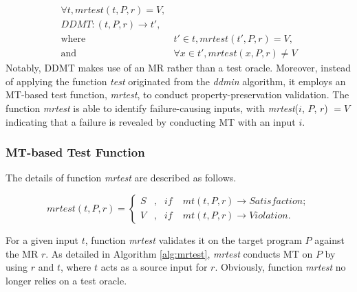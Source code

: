 \begin{equation}
\begin{aligned}
\forall t, mrtest(t,P,r) = V,    & \\
 DDMT: (t, P, r) \rightarrow t', &\\
\text{where } & t' \in t, mrtest(t',P,r)=V, \\
\text{and } & \forall x \in t', mrtest(x,P,r) \neq V
\end{aligned}
\label{eq:ddmt}
\end{equation}
Notably, DDMT makes use of an MR rather than a test oracle.
Moreover, instead of applying the function \emph{test} originated from the \emph{ddmin} algorithm, it employs an MT-based test function, \emph{mrtest}, to conduct property-preservation validation.
The function \emph{mrtest} is able to identify failure-causing inputs, with \emph{mrtest}($i$, $P$, $r$) $= V$ indicating that a failure is revealed by conducting MT with an input $i$.



\subsubsection{MT-based Test Function}
The details of function \emph{mrtest} are described as follows.

\begin{equation}
mrtest(t, P, r) = \left\{
\begin{aligned}
S &, & if \; & mt(t, P, r) \rightarrow Satisfaction; \\
V &, & if \; & mt(t, P, r) \rightarrow Violation.    
\end{aligned}
\right.
\end{equation}

For a given input $t$, function \emph{mrtest} validates it on the target program $P$ against the MR $r$.
As detailed in Algorithm \ref{alg:mrtest}, 
\emph{mrtest} conducts MT on $P$ by using $r$ and $t$, where $t$ acts as a source input for $r$.
Obviously, function \emph{mrtest} no longer relies on a test oracle.




